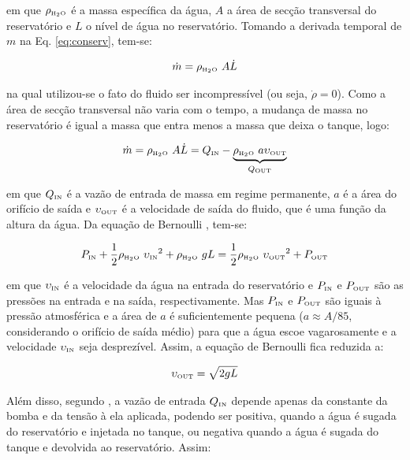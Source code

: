 \noindent em que $\rho_{\tiny \text{\tiny H}_2\text{\tiny O}}$ é a massa
específica da água, $A$ a área de secção transversal do reservatório e $L$ o
nível de água no reservatório. Tomando a derivada temporal de $m$ na Eq.
\ref{eq:conserv}, tem-se:

\begin{equation}
\dot{m} = \rhoagua\ A\dot{L}
\end{equation}

\noindent na qual utilizou-se o fato do fluido ser incompressível (ou seja,
$\dot{\rho} = 0$). Como a área de secção transversal não varia com o tempo, a
mudança de massa no reservatório é igual a massa que entra menos a massa que
deixa o tanque, logo:
 
\begin{equation}\label{eq:mudanca_massa}
\dot{m} = \rho_{\tiny \text{\tiny H}_2\text{\tiny O}}\ A\dot{L} = 
            Q_{\text{\tiny IN}} - 
\underbrace{\rho_{\tiny \text{\tiny H}_2\text{\tiny O}}\ a\upsilon_{\text{\tiny OUT}}}_
           {Q_{\text{\tiny OUT}}}
\end{equation}

\noindent em que $Q_{\text{\tiny IN}}$ é a vazão de entrada de massa em regime
permanente, $a$ é a área do orifício de saída e $\upsilon_{\text{\tiny OUT}}$ é
a velocidade de saída do fluido, que é uma função da altura da água. Da equação
de Bernoulli \cite{houghton:2002}, tem-se:

\begin{equation}
P_{\text{\tiny IN}} + 
\frac{1}{2}\rho_{\tiny \text{\tiny H}_2\text{\tiny O}}\ {\upsilon_{\text{\tiny IN}}}^2 +
\rho_{\tiny \text{\tiny H}_2\text{\tiny O}}\ gL
=
\frac{1}{2}\rho_{\tiny \text{\tiny H}_2\text{\tiny O}}\ {\upsilon_{\text{\tiny OUT}}}^2 +
P_{\text{\tiny OUT}}
\end{equation}

\noindent em que $\upsilon_{\text{\tiny IN}}$ é a velocidade da água na entrada
do reservatório e $P_{\text{\tiny IN}}$ e $P_{\text{\tiny OUT}}$ são as pressões
na entrada e na saída, respectivamente. Mas $P_{\text{\tiny IN}}$ e
$P_{\text{\tiny OUT}}$ são iguais à pressão atmosférica e a área de $a$ é
suficientemente pequena ($a \approx A/85$, considerando o orifício de saída
médio) para que a água escoe vagarosamente e a velocidade $\upsilon_{\text{\tiny
IN}}$ seja desprezível. Assim, a equação de Bernoulli fica reduzida a:

\begin{equation}\label{eq:bernoulli_red}
\upsilon_{\text{\tiny OUT}} = \sqrt{2gL}
\end{equation}

Além disso, segundo , a vazão de entrada
$Q_{\text{\tiny IN}}$ depende apenas da constante da bomba e da tensão à ela
aplicada, podendo ser positiva, quando a água é sugada do reservatório e
injetada no tanque, ou negativa quando a água é sugada do tanque e devolvida ao
reservatório. Assim:

